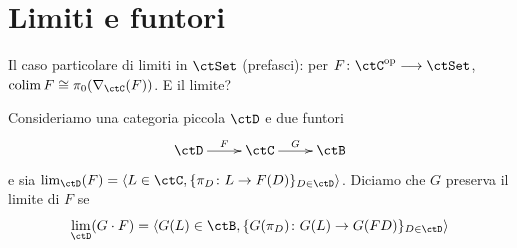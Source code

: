 \section{Limiti e funtori}
\begin{proposition}\label{prop_limiti_colimiti_categorie_funtori}
 \Todo{}
\end{proposition}

\begin{remark}\label{mk_colim_prefasci_pi0_elts}
 Il caso particolare di limiti in \(\ctSet\) (prefasci): per \(F \colon \ctC^\op\fun\ctSet\), \(\colim F\cong \pi_0(\Elts\ctC F)\). E il limite?
\end{remark}

\begin{definition}\label{def_preserv_limiti}
 Consideriamo una categoria piccola \(\ctD\) e due funtori
 \[\xymatrix{\ctD \ar[r]^-{F} & \ctC \ar[r]^-{G} & \ctB}\]
 e sia \(\lim_{\ctD}(F) = \langle L \in \ctC, \{\pi_D \colon L \to F(D)\}_{D \in \ctD}\rangle\). Diciamo che \(G\) preserva il limite di \(F\) se
 \[\lim_{\ctD}(G \cdot F) =  \langle G(L) \in \ctB, \{G(\pi_D) \colon G(L) \to G(FD)\}_{D \in \ctD}\rangle\]
\end{definition}

